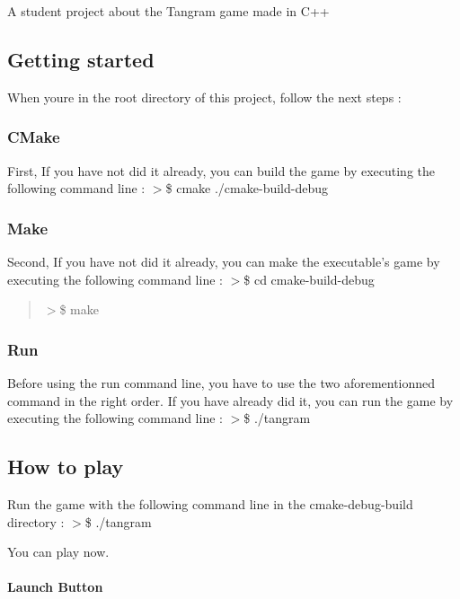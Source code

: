 A student project about the Tangram game made in C++

\subsection*{Getting started}

When you\textquotesingle{}re in the root directory of this project, follow the next steps \+: \subsubsection*{C\+Make}

First, If you have not did it already, you can build the game by executing the following command line \+: $>$\$ cmake ./cmake-\/build-\/debug \subsubsection*{Make}

Second, If you have not did it already, you can make the executable’s game by executing the following command line \+: $>$\$ cd cmake-\/build-\/debug \begin{quote}


$>$\$ make \end{quote}
\subsubsection*{Run}

Before using the run command line, you have to use the two aforementionned command in the right order. If you have already did it, you can run the game by executing the following command line \+: $>$\$ ./tangram

\subsection*{How to play}

Run the game with the following command line in the cmake-\/debug-\/build directory \+: $>$\$ ./tangram

You can play now.

\paragraph*{Launch Button}

